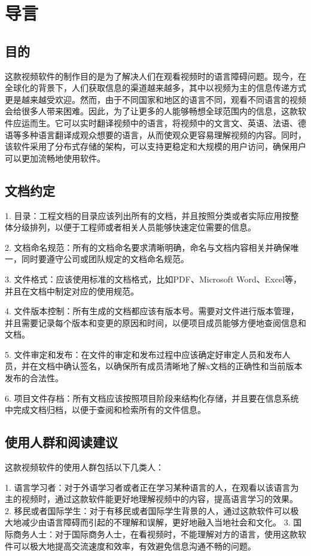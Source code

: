 \chapter{导言}
\label{ch:intro}

\section{目的}

这款视频软件的制作目的是为了解决人们在观看视频时的语言障碍问题。现今，在全球化的背景下，人们获取信息的渠道越来越多，其中以视频为主的信息传递方式更是越来越受欢迎。然而，由于不同国家和地区的语言不同，观看不同语言的视频会给很多人带来困难。因此，为了让更多的人能够畅想全球范围内的信息，这款软件应运而生。它可以实时翻译视频中的语言，将视频中的文言文、英语、法语、德语等多种语言翻译成观众想要的语言，从而使观众更容易理解视频的内容。同时，该软件采用了分布式存储的架构，可以支持更稳定和大规模的用户访问，确保用户可以更加流畅地使用软件。

\section{文档约定}

1. 目录：工程文档的目录应该列出所有的文档，并且按照分类或者实际应用按整体分级排列，以便于工程师或者相关人员能够快速定位需要的信息。

2. 文档命名规范：所有的文档命名要求清晰明确，命名与文档内容相关并确保唯一，同时要遵守公司或团队规定的文档命名规范。

3. 文件格式：应该使用标准的文档格式，比如PDF、Microsoft Word、Excel等，并且在文档中制定对应的使用规范。

4. 文件版本控制：所有生成的文档都应该有版本号。需要对文件进行版本管理，并且需要记录每个版本和变更的原因和时间，以便项目成员能够方便地查阅信息和文档。

5. 文件审定和发布：在文件的审定和发布过程中应该确定好审定人员和发布人员，并在文档中确认签名，以确保所有成员清晰地了解x文档的正确性和当前版本发布的合法性。

6. 项目文件存档：所有文档应该按照项目阶段来结构化存储，并且要在信息系统中完成文档归档，以便于查阅和检索所有的文件信息。

\section{使用人群和阅读建议}

这款视频软件的使用人群包括以下几类人：

1. 语言学习者：对于外语学习者或者正在学习某种语言的人，在观看以该语言为主的视频时，通过这款软件能更好地理解视频中的内容，提高语言学习的效果。
2. 移民或者国际学生：对于有移民或者国际学生背景的人，通过这款软件可以极大地减少由语言障碍而引起的不理解和误解，更好地融入当地社会和文化。
3. 国际商务人士：对于国际商务人士，在看视频时，不能理解对方的语言，使用这款软件可以极大地提高交流速度和效率，有效避免信息沟通不畅的问题。

